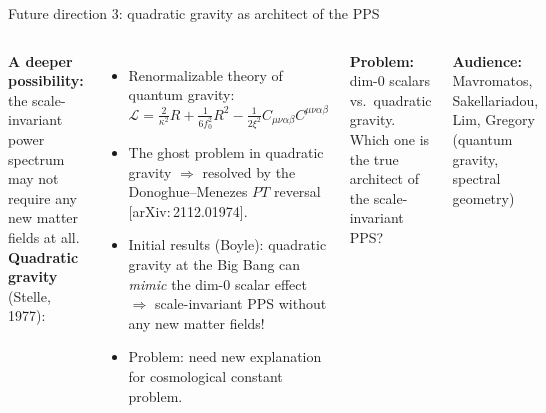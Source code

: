 \documentclass[aspectratio=169]{beamer}
\newcommand{\arxiv}[1]{[arXiv:\,#1]}
\begin{document}
\begin{frame}{Future direction 3: quadratic gravity as architect of the PPS}
  \begin{columns}[T]
    \column{\textwidth}
      \textbf{A deeper possibility:} the scale-invariant power
      spectrum may not require any new matter fields at all.\\[0.4em]
      \textbf{Quadratic gravity} (Stelle, 1977):
      \begin{itemize}
        \item Renormalizable theory of quantum gravity:\\
              $\mathcal{L} = \frac{2}{\kappa^2} R+ \frac{1}{6f_0^2} R^2 - \frac{1}{2\xi^2} C_{\mu\nu\alpha\beta}C^{\mu\nu\alpha\beta} $
        \item The ghost problem in quadratic gravity
              $\Rightarrow$ resolved by the Donoghue--Menezes
              $PT$ reversal \arxiv{2112.01974}.
        \item Initial results (Boyle): quadratic gravity at the
              Big Bang can \emph{mimic} the dim-0 scalar effect $\Rightarrow$ scale-invariant PPS without any new matter fields!
        \item Problem: need new explanation for cosmological constant problem.
      \end{itemize}
      \vspace{-1.5em}
      \begin{block}{}
        \small
        \textbf{Problem:} dim-0 scalars vs.\ quadratic gravity. Which one is the true architect of the scale-invariant PPS?
      \end{block}
      {\footnotesize \textbf{Audience:} Mavromatos, Sakellariadou, Lim,
       Gregory (quantum gravity, spectral geometry)}
  \end{columns}
\end{frame}
\end{document}
